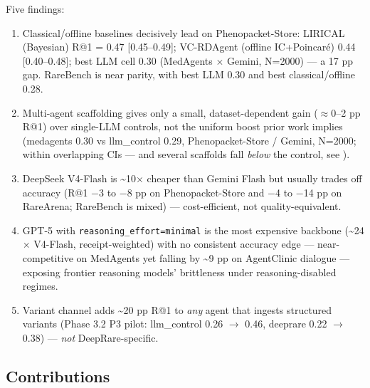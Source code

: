 Five findings:

\begin{enumerate}
\def\labelenumi{\arabic{enumi}.}
\tightlist
\item
  Classical/offline baselines decisively lead on Phenopacket-Store:
  LIRICAL (Bayesian) R@1 = 0.47 {[}0.45--0.49{]};
  VC-RDAgent (offline IC+Poincar\'e) 0.44 {[}0.40--0.48{]}; best LLM cell
  0.30 (MedAgents \ensuremath{\times} Gemini, N=2000) --- a 17 pp gap. RareBench is near
  parity, with best LLM 0.30 and best classical/offline 0.28.
\item
  Multi-agent scaffolding gives only a small, dataset-dependent gain (\ensuremath{\approx}0--2 pp R@1) over single-LLM controls, not the uniform
  boost prior work implies (medagents 0.30 vs llm\_control 0.29,
  Phenopacket-Store / Gemini, N=2000; within overlapping CIs --- and
  several scaffolds fall \emph{below} the control, see ).
\item
  DeepSeek V4-Flash is \textasciitilde10\ensuremath{\times} cheaper than Gemini Flash but usually trades off accuracy (R@1 \ensuremath{-}3 to \ensuremath{-}8 pp on Phenopacket-Store and
  \ensuremath{-}4 to \ensuremath{-}14 pp on RareArena; RareBench is mixed) --- cost-efficient,
  not quality-equivalent.
\item
  GPT-5 with \texttt{reasoning\_effort=minimal} is the most expensive backbone (\textasciitilde24\ensuremath{\times} V4-Flash, receipt-weighted) with no consistent accuracy edge --- near-competitive on MedAgents yet falling by
  \textasciitilde9 pp on AgentClinic dialogue ---
  exposing frontier reasoning models' brittleness under
  reasoning-disabled regimes.
\item
  Variant channel adds \textasciitilde20 pp R@1 to \emph{any} agent that ingests structured variants (Phase 3.2 P3 pilot: llm\_control 0.26 \ensuremath{\rightarrow} 0.46,
  deeprare 0.22 \ensuremath{\rightarrow} 0.38) --- \emph{not} DeepRare-specific.
\end{enumerate}

\subsection{Contributions}\label{sec-2-6}

